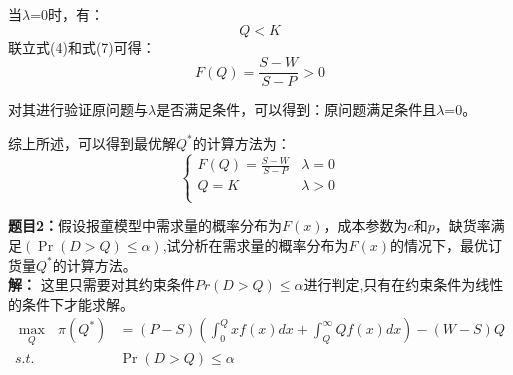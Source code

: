 \documentclass[12pt,a4paper]{article}
\begin{document}
当$\lambda$=0时，有：
\begin{equation}
    Q<K
\end{equation}
联立式(4)和式(7)可得：
\begin{equation}
    F\left(Q\right)=\frac{S-W}{S-P} >0
\end{equation}

对其进行验证原问题与$\lambda$是否满足条件，可以得到：原问题满足条件且$\lambda$=0。

综上所述，可以得到最优解$Q^*$的计算方法为：
\begin{equation}
    \left\{ \begin{matrix}
        F\left(Q\right)=\frac{S-W}{S-P}  &	 \lambda=0	\\
        Q=K  &	\lambda>0	\\
    \end{matrix} \right. 
\end{equation}



\vspace{5pt}
\noindent
{\bf 题目2：}假设报童模型中需求量的概率分布为$F(x)$，成本参数为$c$和$p$，缺货率满足$(\Pr\left(D > Q\right)\leq \alpha )$,试分析在需求量的概率分布为$F(x)$的情况下，最优订货量$Q^*$的计算方法。
\vspace{5pt}
\noindent \\
{\bf 解：}
这里只需要对其约束条件$Pr\left(D > Q\right)\leq \alpha$进行判定,只有在约束条件为线性的条件下才能求解。
\begin{align}
    \max_Q\text{\ }\pi \left( Q^{*} \right) &=\left( P-S \right) \left( \int_0^Q{xf\left( x \right) dx+\int_Q^{\infty}{Qf\left( x \right) dx}} \right) -\left( W-S \right) Q \\
    s.t.&\Pr\left(D > Q\right)\leq \alpha
\end{align}
\end{document}
